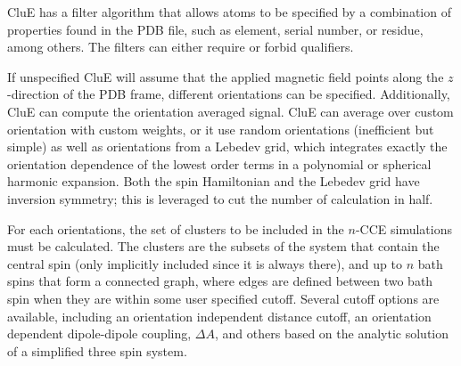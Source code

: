 \documentclass{book}
\begin{document}
CluE has a filter algorithm that allows atoms to be specified by a combination 
of properties found in the PDB file, such as element, serial number, or residue,
among others.  The filters can either require or forbid qualifiers.
  
If unspecified CluE will assume that the applied magnetic field points
along the $z$-direction of the PDB frame, different orientations can be
specified.  Additionally, CluE can compute the orientation averaged signal.
CluE can average over custom orientation with custom weights, 
or it use random orientations (inefficient but simple) 
as well as orientations from a Lebedev grid, which integrates exactly 
the orientation dependence of the lowest order terms in a 
polynomial or spherical harmonic expansion\cite{1999_Lebedev}.  
Both the spin Hamiltonian and the Lebedev grid have inversion symmetry; 
this is leveraged to cut the number of calculation in half.

For each orientations, the set of clusters to be included in the $n$-CCE 
simulations must be calculated.  The clusters are the subsets of the system
that contain the central spin (only implicitly included since it is always 
there), and up to $n$ bath spins that form a connected graph, where edges are
defined between two bath spin when they are within some user specified cutoff.
Several cutoff options are available, including 
an orientation independent distance cutoff, 
an orientation dependent dipole-dipole coupling, $\Delta A$, and others
based on the analytic solution of a simplified three spin system.
\end{document}
